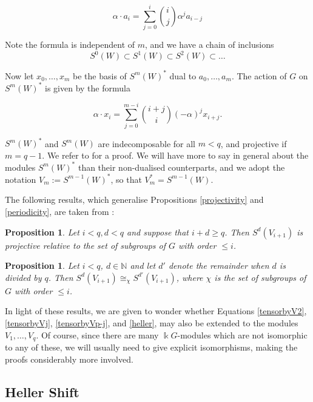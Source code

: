 \documentclass[a4paper]{amsart}
\newcommand{\kk}{\Bbbk}
\def\N{\mathbb{N}}
\newtheorem{Proposition}[Lemma]{Proposition}
\theoremstyle{definition}
\theoremstyle{remark}
\theoremstyle{Acknowledgments}
\begin{document}
\begin{equation}\label{action} \alpha \cdot a_i = \sum_{j=0}^i \binom{i}{j} \alpha^j a_{i-j}
\end{equation}

Note the formula is independent of $m$, and we have a chain of inclusions
\[S^0(W) \subset S^1(W) \subset S^2(W) \subset \ldots \]

Now let $x_0,\ldots, x_m$ be the basis of $S^m(W)^*$ dual to $a_0,\ldots, a_m$. The action of $G$ on $S^m(W)^*$ is given by the formula

\begin{equation}\label{dualaction} \alpha \cdot x_i  = \sum_{j=0}^{m-i}\binom{i+j}{i}(-\alpha)^j x_{i+j}.
\end{equation}

$S^m(W)^*$ and $S^m(W)$ are indecomposable for all $m<q$, and projective if $m=q-1$. We refer to \cite[Proposition~3.4]{ElmerSympowers} for a proof. We will have more to say in general about the modules $S^m(W)^*$ than their non-dualised counterparts, and we adopt the notation $V_m:= S^{m-1}(W)^*$, so that $V_m^* = S^{m-1}(W)$. 

The following results, which generalise Propositions \ref{projectivity} and \ref{periodicity}, are taken from \cite{ElmerSympowers}:

\begin{Proposition} Let $i<q, d<q$ and suppose that $i+d \geq q$. Then $S^d(V_{i+1})$ is projective relative to the set of subgroups of $G$ with order $\leq i$.
\end{Proposition}

\begin{Proposition} Let $i<q$, $d \in \N$ and let $d'$ denote the remainder when $d$ is divided by $q$. Then $S^{d}(V_{i+1}) \cong_{\chi} S^{d'}(V_{i+1})$, where $\chi$ is the set of subgroups of $G$ with order $\leq i$.
\end{Proposition}

In light of these results, we are given to wonder whether Equations \eqref{tensorbyV2}, \eqref{tensorbyVj}, \eqref{tensorbyVp-j}, and \eqref{heller}, may also be extended to the modules $V_1, \ldots, V_q$. Of course, since there are many $\kk G$-modules which are not isomorphic to any of these, we will usually need to give explicit isomorphisms, making the proofs considerably more involved.

\subsection{Heller Shift}
\end{document}
